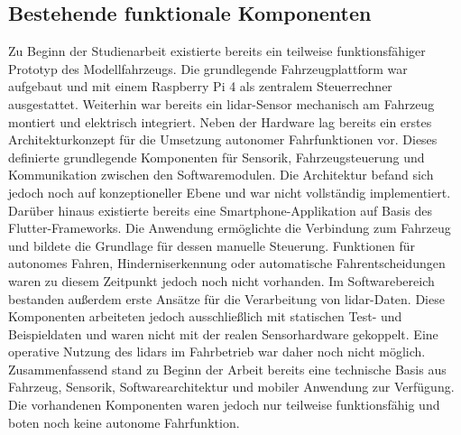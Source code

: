 \subsection{Bestehende funktionale Komponenten}
Zu Beginn der Studienarbeit existierte bereits ein teilweise funktionsfähiger Prototyp des Modellfahrzeugs. Die grundlegende Fahrzeugplattform war aufgebaut und mit einem Raspberry Pi 4 als zentralem Steuerrechner ausgestattet. Weiterhin war bereits ein \gls{lidar}-Sensor mechanisch am Fahrzeug montiert und elektrisch integriert. Neben der Hardware lag bereits ein erstes Architekturkonzept für die Umsetzung autonomer Fahrfunktionen vor. Dieses definierte grundlegende Komponenten für Sensorik, Fahrzeugsteuerung und Kommunikation zwischen den Softwaremodulen. Die Architektur befand sich jedoch noch auf konzeptioneller Ebene und war nicht vollständig implementiert. Darüber hinaus existierte bereits eine Smartphone-Applikation auf Basis des Flutter-Frameworks. Die Anwendung ermöglichte die Verbindung zum Fahrzeug und bildete die Grundlage für dessen manuelle Steuerung. Funktionen für autonomes Fahren, Hinderniserkennung oder automatische Fahrentscheidungen waren zu diesem Zeitpunkt jedoch noch nicht vorhanden. Im Softwarebereich bestanden außerdem erste Ansätze für die Verarbeitung von \gls{lidar}-Daten. Diese Komponenten arbeiteten jedoch ausschließlich mit statischen Test- und Beispieldaten und waren nicht mit der realen Sensorhardware gekoppelt. Eine operative Nutzung des \gls{lidar}s im Fahrbetrieb war daher noch nicht möglich. Zusammenfassend stand zu Beginn der Arbeit bereits eine technische Basis aus Fahrzeug, Sensorik, Softwarearchitektur und mobiler Anwendung zur Verfügung. Die vorhandenen Komponenten waren jedoch nur teilweise funktionsfähig und boten noch keine autonome Fahrfunktion.

